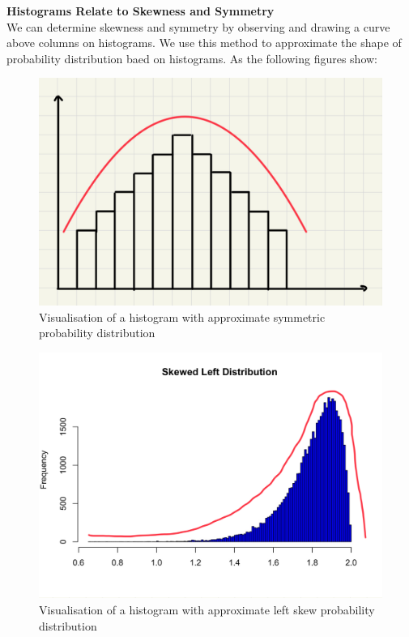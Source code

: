 \noindent
\textbf{Histograms Relate to Skewness and Symmetry}\\

\noindent
We can determine skewness and symmetry by observing and drawing a curve above columns on histograms. We use this method to approximate the shape of probability distribution baed on histograms. As the following figures show:

\begin{figure}[H]
 \centering
 \includegraphics[scale=0.15]{Section1/img/HisSymm.jpg}
 \caption{Visualisation of a histogram with approximate symmetric probability distribution}
\end{figure}

\begin{figure}[H]
 \centering
 \includegraphics[scale=0.15]{Section1/img/HisL.jpg}
 \caption{Visualisation of a histogram with approximate left skew probability distribution}
\end{figure}


